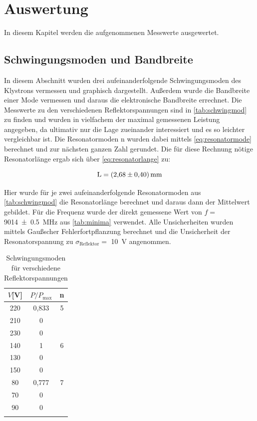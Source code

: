 


\section{Auswertung}
\label{sec:auswertung}

In diesem Kapitel werden die aufgenommenen Messwerte ausgewertet.




\subsection{Schwingungsmoden und Bandbreite}
\label{sec:schwingungsmoden}

In diesem Abschnitt wurden drei aufeinanderfolgende Schwingungsmoden des Klystrons vermessen und graphisch dargestellt.
Außerdem wurde die Bandbreite einer Mode vermessen und daraus die elektronische Bandbreite errechnet.
Die Messwerte zu den verschiedenen Reflektorspannungen sind in \autoref{tab:schwingmod} zu finden und wurden in vielfachem der maximal gemessenen Leistung angegeben, da ultimativ nur die Lage zueinander interessiert und es so leichter vergleichbar ist.
Die Resonatormoden n wurden dabei mittels \autoref{eq:resonatormode} berechnet und zur nächsten ganzen Zahl gerundet. Die für diese Rechnung nötige Resonatorlänge ergab sich über \autoref{eq:resonatorlange} zu:

\begin{equation}
\label{eq:auswertunglänge}
\text{L} = \SI{2,68\pm0,40}{\milli\metre}
\end{equation}

Hier wurde für je zwei aufeinanderfolgende Resonatormoden aus \autoref{tab:schwingmod} die Resonatorlänge berechnet und daraus dann der Mittelwert gebildet. Für die Frequenz wurde der direkt gemessene Wert von $f =$ \SI{9014\pm0,5}{\mega\hertz} aus \autoref{tab:minima} verwendet. Alle Unsicherheiten wurden mittels Gaußscher Fehlerfortpflanzung berechnet und die Unsicherheit der Resonatorspannung zu $\sigma_\text{Reflektor} =$ \SI{10}{\volt} angenommen.


\begin{table}
\centering
\caption{Schwingungsmoden für verschiedene Reflektorspannungen}
\begin{tabular}{c c c}
\toprule
{$V$[V]} & {$P/P_{\text{max}}$} & {n}\\
\midrule
220&	0,833&5\\
210	&0&\\
230	&0&\\
\midrule
140	&1&6\\
130	&0&\\
150	&0&\\
\midrule
80	&0,777&7\\
70	&0&\\
90	&0&\\
\bottomrule
\label{tab:schwingmod}
\end{tabular}
\end{table}





